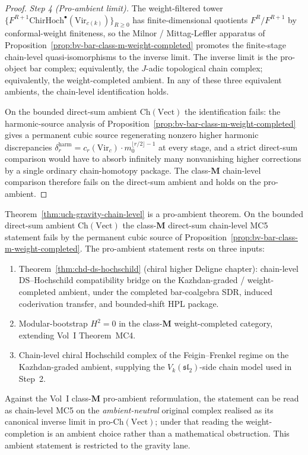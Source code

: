 \begin{proof}
\emph{Step 4 (Pro-ambient limit).} The weight-filtered tower
$\{F^{R+1}\mathrm{ChirHoch}^\bullet(\mathrm{Vir}_{c(k)})\}_{R \geq 0}$
has finite-dimensional quotients $F^{R} / F^{R+1}$ by
conformal-weight finiteness, so the Milnor / Mittag-Leffler apparatus
of Proposition~\ref{prop:bv-bar-class-m-weight-completed} promotes
the finite-stage chain-level quasi-isomorphisms to the inverse limit.
The inverse limit is the pro-object bar complex; equivalently, the
$J$-adic topological chain complex; equivalently, the weight-completed
ambient. In any of these three equivalent ambients, the chain-level
identification holds.

On the bounded direct-sum ambient $\mathrm{Ch}(\mathrm{Vect})$ the
identification fails: the harmonic-source analysis of
Proposition~\ref{prop:bv-bar-class-m-weight-completed} gives a
permanent cubic source regenerating nonzero higher harmonic
discrepancies $\delta_r^{\mathrm{harm}} =
c_r(\mathrm{Vir}_c) \cdot m_0^{\lfloor r/2 \rfloor - 1}$ at every
stage, and a strict direct-sum comparison would have to absorb
infinitely many nonvanishing higher corrections by a single ordinary
chain-homotopy package. The class-$\mathbf M$ chain-level comparison
therefore fails on the direct-sum ambient and holds on the
pro-ambient.
\end{proof}

\begin{remark}
\label{rem:uch-gravity-chain-level-promotion}
Theorem~\ref{thm:uch-gravity-chain-level} is a pro-ambient theorem.
On the bounded direct-sum ambient $\mathrm{Ch}(\mathrm{Vect})$ the
class-$\mathbf M$ direct-sum chain-level MC5 statement fails by the
permanent cubic source of
Proposition~\ref{prop:bv-bar-class-m-weight-completed}. The
pro-ambient statement rests on three inputs:
\begin{enumerate}
\item Theorem~\ref{thm:chd-ds-hochschild} (chiral higher Deligne
chapter): chain-level DS--Hochschild compatibility bridge on the
Kazhdan-graded / weight-completed ambient, under the completed
bar-coalgebra SDR, induced coderivation transfer, and bounded-shift HPL
package.
\item Modular-bootstrap $H^2 = 0$ in the class-$\mathbf M$
weight-completed category, extending Vol~I Theorem~MC4.
\item Chain-level chiral Hochschild complex of the Feigin--Frenkel
regime on the Kazhdan-graded ambient, supplying the
$V_k(\mathfrak{sl}_2)$-side chain model used in Step~2.
\end{enumerate}
Against the Vol~I class-$\mathbf M$ pro-ambient reformulation, the
statement can be read as chain-level MC5 on the
\emph{ambient-neutral} original complex realised as its canonical
inverse limit in
$\mathrm{pro}\text{-}\mathrm{Ch}(\mathrm{Vect})$; under that reading
the weight-completion is an ambient choice rather than a mathematical
obstruction. This ambient statement is restricted to the gravity lane.
\end{remark}

